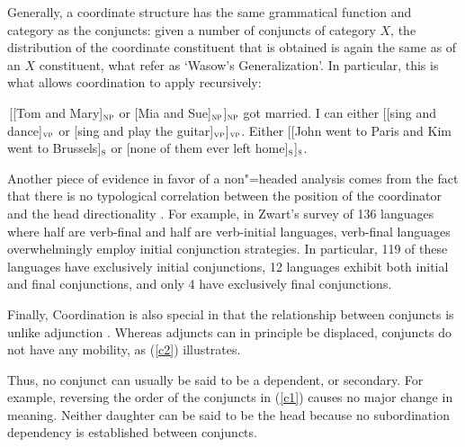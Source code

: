 \documentclass[output=paper]{langsci/langscibook}
\newcommand{\subl}[1]{$_{\small \textsc{#1}}$}
\begin{document}
Generally, a coordinate structure has the same grammatical function and category as the conjuncts: given a number of
conjuncts of category $X$, the distribution of the coordinate constituent that is obtained is again the same
as of an $X$ constituent, what \citet{pullumzwicky} refer as `Wasow's Generalization'.
In particular, this is what allows coordination to apply recursively:

\begin{exe}
\ex
\begin{xlista}
\ex \,[[Tom and Mary]\subl{np} or [Mia and Sue]\subl{np}]\subl{np} got married.
\ex I can either [[sing and dance]\subl{vp} or [sing and play the guitar]\subl{vp}]\subl{vp}.
\ex Either [[John went to Paris and Kim went to Brussels]\subl{s} or
[none of them ever left home]\subl{s}]\subl{s}.
\end{xlista}
\end{exe}

Another piece of evidence in favor of a non"=headed analysis comes from the fact that there is no typological correlation between the position of the coordinator and the head directionality \citet{zwart}. For example, in Zwart's  survey of 136 languages where half are verb-final and half
are verb-initial languages,  verb-final languages overwhelmingly employ initial conjunction strategies.
In particular, 119 of these languages have exclusively initial conjunctions, 12 languages exhibit both initial
and final conjunctions, and only 4 have exclusively final conjunctions. 


Finally, Coordination is also special in that the relationship between conjuncts is unlike adjunction \citep{levinepostal}.
Whereas adjuncts can in principle be displaced, conjuncts do not have any mobility, as (\ref{c2}) illustrates.

\begin{exe}
\ex
\begin{xlista}
\end{xlista}\label{c2}
\end{exe}


\noindent
Thus, no conjunct can usually be said to be a dependent, or secondary. For example,  reversing the order of the conjuncts in (\ref{c1}) causes no major change in meaning. Neither daughter can be said to be the head because no subordination dependency is established between conjuncts.
\end{document}
